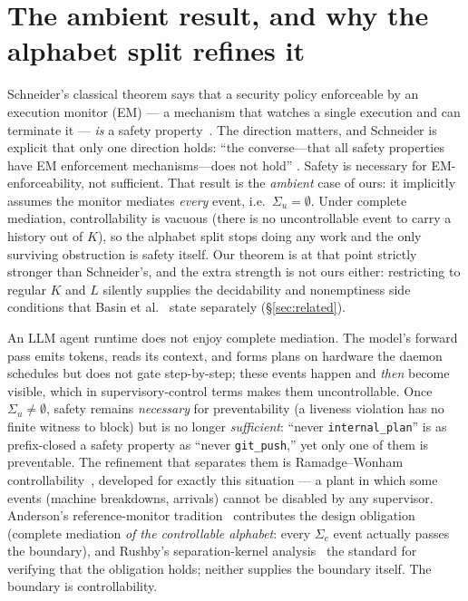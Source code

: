 \documentclass[11pt,a4paper]{article}  \usepackage{mdframed} \usepackage{graphicx}
\begin{document}
\section{The ambient result, and why the alphabet split refines it}\label{sec:schneider} Schneider's classical theorem says
that a security policy enforceable by an execution monitor (EM) --- a mechanism that watches a single execution and can
terminate it --- \emph{is} a safety property~\cite{schneider}. The direction matters, and Schneider is explicit that only one
direction holds: ``the converse---that all safety properties have EM enforcement mechanisms---does not hold''
\cite[p.~35]{schneider}. Safety is necessary for EM-enforceability, not sufficient. That result is the \emph{ambient} case of
ours: it implicitly assumes the monitor mediates \emph{every} event, i.e.\ $\Sigma_u=\emptyset$. Under complete mediation,
controllability is vacuous (there is no uncontrollable event to carry a history out of $K$), so the alphabet split stops
doing any work and the only surviving obstruction is safety itself. Our theorem is at that point strictly stronger than
Schneider's, and the extra strength is not ours either: restricting to regular $K$ and $L$ silently supplies the
decidability and nonemptiness side conditions that Basin et al.~\cite{bjkz13} state separately (\S\ref{sec:related}).

An LLM agent runtime does not enjoy complete mediation. The model's forward pass emits tokens, reads its context, and forms
plans on hardware the daemon schedules but does not gate step-by-step; these events happen and \emph{then} become visible,
which in supervisory-control terms makes them uncontrollable. Once $\Sigma_u\neq\emptyset$, safety remains \emph{necessary}
for preventability (a liveness violation has no finite witness to block) but is no longer \emph{sufficient}: ``never
\texttt{internal\_plan}'' is as prefix-closed a safety property as ``never \texttt{git\_push},'' yet only one of them is
preventable. The refinement that separates them is Ramadge--Wonham controllability~\cite{rw87,rw89}, developed for exactly
this situation --- a plant in which some events (machine breakdowns, arrivals) cannot be disabled by any supervisor.
Anderson's reference-monitor tradition~\cite{anderson} contributes the design obligation (complete mediation \emph{of the
controllable alphabet}: every $\Sigma_c$ event actually passes the boundary), and Rushby's separation-kernel
analysis~\cite{rushby} the standard for verifying that the obligation holds; neither supplies the boundary itself. The
boundary is controllability.
\end{document}
